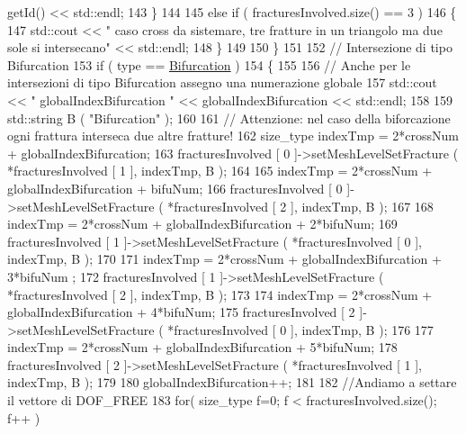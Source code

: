 \begin{DoxyCode}
      getId() << std::endl;
143                 \}
144 
145                \textcolor{keywordflow}{else} \textcolor{keywordflow}{if} ( fracturesInvolved.size() == 3 )
146                \{
147                    std::cout << \textcolor{stringliteral}{" caso cross da sistemare, tre fratture in un triangolo ma due sole si
       intersecano"} << std::endl;
148                \}
149                
150            \}
151            
152            \textcolor{comment}{// Intersezione di tipo Bifurcation}
153            \textcolor{keywordflow}{if} ( type == \hyperlink{classFractureIntersect_a9a4e4a784fa4c8e359767ed543f89dc5a4d466b3d3de0af7e18732b6f765bb1af}{Bifurcation} )
154            \{
155                
156                \textcolor{comment}{// Anche per le intersezioni di tipo Bifurcation assegno una numerazione globale}
157                std::cout << \textcolor{stringliteral}{" globalIndexBifurcation "} << globalIndexBifurcation << std::endl;
158                
159                std::string B ( \textcolor{stringliteral}{"Bifurcation"} );
160                
161                \textcolor{comment}{// Attenzione: nel caso della biforcazione ogni frattura interseca due altre fratture!}
162                size\_type indexTmp = 2*crossNum + globalIndexBifurcation;
163                fracturesInvolved [ 0 ]->setMeshLevelSetFracture ( *fracturesInvolved [ 1 ], indexTmp, B );
164   
165                indexTmp = 2*crossNum + globalIndexBifurcation + bifuNum;
166                fracturesInvolved [ 0 ]->setMeshLevelSetFracture ( *fracturesInvolved [ 2 ], indexTmp, B );
167 
168                indexTmp = 2*crossNum + globalIndexBifurcation + 2*bifuNum;
169                fracturesInvolved [ 1 ]->setMeshLevelSetFracture ( *fracturesInvolved [ 0 ], indexTmp, B );
170 
171                indexTmp = 2*crossNum + globalIndexBifurcation + 3*bifuNum ;
172                fracturesInvolved [ 1 ]->setMeshLevelSetFracture ( *fracturesInvolved [ 2 ], indexTmp, B );
173 
174                indexTmp = 2*crossNum + globalIndexBifurcation + 4*bifuNum;
175                fracturesInvolved [ 2 ]->setMeshLevelSetFracture ( *fracturesInvolved [ 0 ], indexTmp, B );
176 
177                indexTmp = 2*crossNum + globalIndexBifurcation + 5*bifuNum;
178                fracturesInvolved [ 2 ]->setMeshLevelSetFracture ( *fracturesInvolved [ 1 ], indexTmp, B );
179 
180                globalIndexBifurcation++;
181                
182                \textcolor{comment}{//Andiamo a settare il vettore di DOF\_FREE}
183                \textcolor{keywordflow}{for}( size\_type f=0; f < fracturesInvolved.size(); f++ )

\end{DoxyCode}
